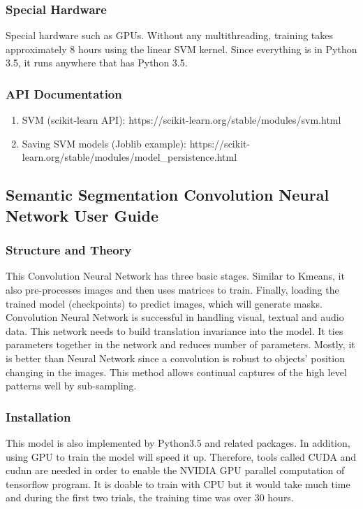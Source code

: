 \documentclass[10pt,journal,compsoc, draftclsnofoot,onecolumn]{IEEEtran}
\begin{document}
\subsubsection{Special Hardware}
Special hardware such as GPUs.
Without any multithreading, training takes approximately 8 hours using the linear SVM kernel.
Since everything is in Python 3.5, it runs anywhere that has Python 3.5.

\subsubsection{API Documentation}
\begin{enumerate}
\item SVM (scikit-learn API): https://scikit-learn.org/stable/modules/svm.html

\noindent
\item Saving SVM models (Joblib example): https://scikit-learn.org/stable/modules/model\_persistence.html

\end{enumerate}


\subsection{Semantic Segmentation Convolution Neural Network User Guide}
\subsubsection{Structure and Theory}
This Convolution Neural Network has three basic stages. Similar to Kmeans, it also pre-processes images and then uses matrices to train. Finally, loading the trained model (checkpoints) to predict images, which will generate masks. \\

\noindent
Convolution Neural Network is successful in handling visual, textual and audio data. This network needs to build translation invariance into the model. It ties parameters together in the network and reduces number of parameters. Mostly, it is better than Neural Network since a convolution is robust to objects' position changing in the images. This method allows continual captures of the high level patterns well by sub-sampling.

\subsubsection{Installation}
This model is also implemented by Python3.5 and related packages. In addition, using GPU to train the model will speed it up. Therefore, tools called CUDA and cudnn are needed in order to enable the NVIDIA GPU parallel computation of tensorflow program. It is doable to train with CPU but it would take much time and during the first two trials, the training time was over 30 hours. \\
\end{document}
